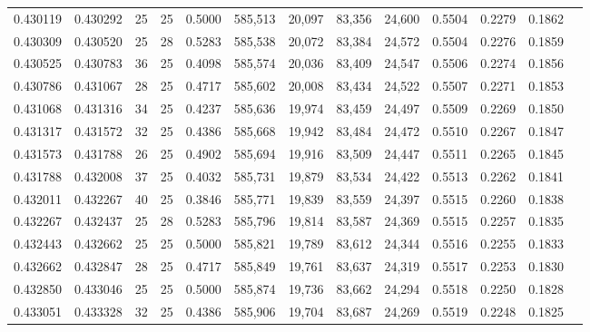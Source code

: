 \begin{tabular}{rrrrrrrrrrrrr}
0.430119 & 0.430292 &    25 &  25 &                                     0.5000 & 585,513 &  20,097 &  83,356 &  24,600 & 0.5504 & 0.2279 & 0.1862 \\
0.430309 & 0.430520 &    25 &  28 &                                     0.5283 & 585,538 &  20,072 &  83,384 &  24,572 & 0.5504 & 0.2276 & 0.1859 \\
0.430525 & 0.430783 &    36 &  25 &                                     0.4098 & 585,574 &  20,036 &  83,409 &  24,547 & 0.5506 & 0.2274 & 0.1856 \\
0.430786 & 0.431067 &    28 &  25 &                                     0.4717 & 585,602 &  20,008 &  83,434 &  24,522 & 0.5507 & 0.2271 & 0.1853 \\
0.431068 & 0.431316 &    34 &  25 &                                     0.4237 & 585,636 &  19,974 &  83,459 &  24,497 & 0.5509 & 0.2269 & 0.1850 \\
0.431317 & 0.431572 &    32 &  25 &                                     0.4386 & 585,668 &  19,942 &  83,484 &  24,472 & 0.5510 & 0.2267 & 0.1847 \\
0.431573 & 0.431788 &    26 &  25 &                                     0.4902 & 585,694 &  19,916 &  83,509 &  24,447 & 0.5511 & 0.2265 & 0.1845 \\
0.431788 & 0.432008 &    37 &  25 &                                     0.4032 & 585,731 &  19,879 &  83,534 &  24,422 & 0.5513 & 0.2262 & 0.1841 \\
0.432011 & 0.432267 &    40 &  25 &                                     0.3846 & 585,771 &  19,839 &  83,559 &  24,397 & 0.5515 & 0.2260 & 0.1838 \\
0.432267 & 0.432437 &    25 &  28 &                                     0.5283 & 585,796 &  19,814 &  83,587 &  24,369 & 0.5515 & 0.2257 & 0.1835 \\
0.432443 & 0.432662 &    25 &  25 &                                     0.5000 & 585,821 &  19,789 &  83,612 &  24,344 & 0.5516 & 0.2255 & 0.1833 \\
0.432662 & 0.432847 &    28 &  25 &                                     0.4717 & 585,849 &  19,761 &  83,637 &  24,319 & 0.5517 & 0.2253 & 0.1830 \\
0.432850 & 0.433046 &    25 &  25 &                                     0.5000 & 585,874 &  19,736 &  83,662 &  24,294 & 0.5518 & 0.2250 & 0.1828 \\
0.433051 & 0.433328 &    32 &  25 &                                     0.4386 & 585,906 &  19,704 &  83,687 &  24,269 & 0.5519 & 0.2248 & 0.1825 \\

\end{tabular}
